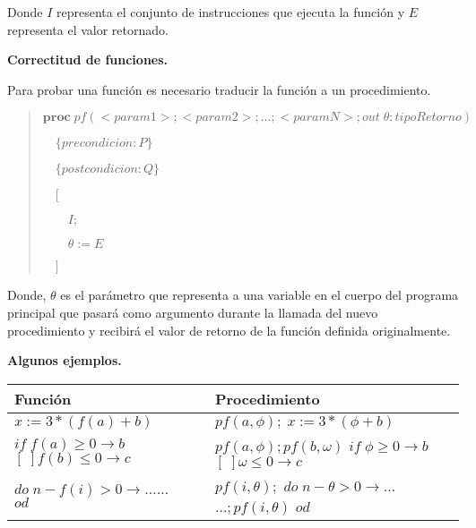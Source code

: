 \documentclass[hidelinks]{article}
\newenvironment{absolutelynopagebreak}
{\Needspace{10\baselineskip}\begin{quote}}
		{\end{quote}}
\begin{document}
Donde $I$ representa el conjunto de instrucciones que ejecuta la función y $E$
representa el valor retornado.\par

\textbf{Correctitud de funciones.}\par
Para probar una función es necesario traducir la función a un procedimiento.\par

\begin{absolutelynopagebreak}
	$\textbf{proc} \; pf(<param1>; <param2>; \dots; <paramN>; out \; \theta: tipoRetorno)$ \par
	$\quad \{precondicion: P\}$ \par
	$\quad \{postcondicion: Q\}$\par
	$\quad [$\par
			$\qquad I;$\par
			$\qquad \theta := E$\par
			$\quad ]$\par
\end{absolutelynopagebreak}

Donde, $\theta$ es el parámetro que representa a una variable en el cuerpo del
programa principal que pasará como argumento durante la llamada del nuevo
procedimiento y recibirá el valor de retorno de la función definida
originalmente.\par

\textbf{Algunos ejemplos.}\par

\begingroup
\setlength\tabcolsep{3pt}
\small
\begin{tabular}{b{2in}c  b{2in}r}
	\toprule
	{\bfseries Función}                                                      &  & {\bfseries Procedimiento}                                                                                         \\
	\midrule
	$x := 3*(f(a) + b)$                                                      &  & $pf(a,\phi); \; x := 3*(\phi + b)$                                                                                \\
	\midrule
	$if \; f(a) \geq 0 \rightarrow b$\newline $[\;] f(b) \leq 0 \rightarrow c$ &  & $pf(a, \phi);pf(b,\omega)$ \newline $if \; \phi \geq 0 \rightarrow b$\newline $[\;] \omega \leq 0 \rightarrow c$    \\
	\midrule
	$do \; n - f(i) > 0 \rightarrow \dots $\newline $\dots$ \newline $od$    &  & $pf(i, \theta);$ \newline $do \; n - \theta > 0 \rightarrow \dots $\newline $\dots; pf(i,\theta)$ \newline $od$ & \\
	\midrule
\end{tabular}
\endgroup
\end{document}
